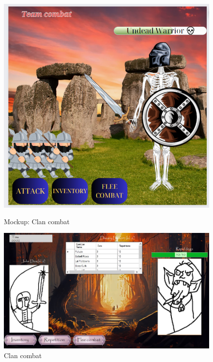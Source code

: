 \begin{figure}[h]
    \centering
    \begin{minipage}[b]{0.45\textwidth}
        \centering
    \includegraphics[width=\textwidth]{omockup6.jpg}
    \caption{Mockup: Clan combat}
    \end{minipage}
        \hfill
    \begin{minipage}[b]{0.45\textwidth}
        \centering
    \includegraphics[width=\textwidth]{mockup5.jpg}
    \caption{Clan combat}
    \end{minipage}
\end{figure}



